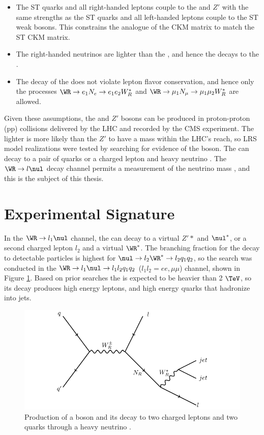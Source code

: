 \begin{itemize}
	\item The ST quarks and all right-handed leptons couple to the \WR and $Z'$ with the same strengths 
		as the ST quarks and all left-handed leptons couple to the ST weak bosons.  This constrains the 
		\WR analogue of the CKM matrix to match the ST CKM matrix.
	\item The right-handed neutrinos \nul are lighter than the \WR, and hence the \WR decays to the \nul.
	\item The decay of the \nul does not violate lepton flavor conservation, and hence only the processes 
		$\WR \rightarrow e_{1}N_{e} \rightarrow e_{1}e_{2}W^{*}_{R}$ and $\WR \rightarrow \mu_{1}N_{\mu} \rightarrow \mu_{1}\mu_{2}W^{*}_{R}$ are allowed.
\end{itemize}
Given these assumptions, the \WR and $Z'$ bosons can be produced in proton-proton (pp) collisions delivered by 
the LHC and recorded by the CMS experiment.  The lighter \WR is more likely than the $Z'$ to have a mass within 
the LHC's reach, so LRS model realizations were tested by searching for evidence of the \WR boson.  The \WR 
can decay to a pair of quarks or a charged lepton and heavy neutrino \nul.  The $\WR \rightarrow l\nul$ 
decay channel permits a measurement of the neutrino mass \mnul, and this is the subject of this thesis.


\section{Experimental Signature}
\label{sec:lrsExpSignature}
In the $\WR \rightarrow l_{1}\nul$ channel, the \nul can decay to a virtual $Z'*$ and $\nul^{*}$, or a second 
charged lepton $l_{2}$ and a virtual $\WR^{*}$.  The branching fraction for the \nul decay to detectable particles 
is highest for $\nul \rightarrow l_{2}\WR^{*} \rightarrow l_{2}q_{1}q_{2}$, so the \WR search was conducted in the 
$\WR \rightarrow l_{1}\nul \rightarrow l_{1}l_{2}q_{1}q_{2}$ ($l_{1}l_{2} = ee,\mu\mu$) channel, shown in 
Figure \ref{fig:wrFeynmanDiagram}.  Based on prior searches \cite{cmsWRRunOneResults} the \WR is expected to 
be heavier than 2 $\TeV$, so its decay produces high energy leptons, and high energy quarks that hadronize into jets.

\begin{figure}[h]
	\centering
	\includegraphics[width=1.0\textwidth]{figures/feynman.pdf}
	\caption{Production of a \WR boson and its decay to two charged leptons and two quarks through 
	a heavy neutrino \nul.}
	\label{fig:wrFeynmanDiagram}
\end{figure}


